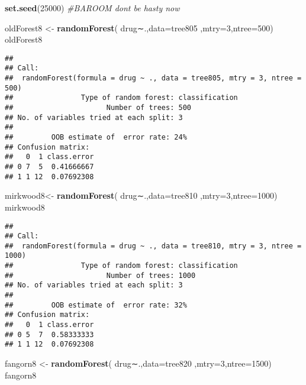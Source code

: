 \documentclass[]{article}
\newenvironment{Shaded}{\begin{snugshade}}{\end{snugshade}}
\newcommand{\KeywordTok}[1]{\textcolor[rgb]{0.13,0.29,0.53}{\textbf{#1}}}
\newcommand{\DataTypeTok}[1]{\textcolor[rgb]{0.13,0.29,0.53}{#1}}
\newcommand{\DecValTok}[1]{\textcolor[rgb]{0.00,0.00,0.81}{#1}}
\newcommand{\StringTok}[1]{\textcolor[rgb]{0.31,0.60,0.02}{#1}}
\newcommand{\CommentTok}[1]{\textcolor[rgb]{0.56,0.35,0.01}{\textit{#1}}}
\newcommand{\NormalTok}[1]{#1}
\begin{document}
\begin{Shaded}
\begin{Highlighting}[]
\KeywordTok{set.seed}\NormalTok{(}\DecValTok{25000}\NormalTok{)}
\CommentTok{#BAROOM dont be hasty now}

\NormalTok{oldForest8 <-}\StringTok{ }\KeywordTok{randomForest}\NormalTok{( drug∼.,}\DataTypeTok{data=}\NormalTok{tree805  ,}\DataTypeTok{mtry=}\DecValTok{3}\NormalTok{,}\DataTypeTok{ntree=}\DecValTok{500}\NormalTok{)}
\NormalTok{oldForest8}
\end{Highlighting}
\end{Shaded}

\begin{verbatim}
## 
## Call:
##  randomForest(formula = drug ~ ., data = tree805, mtry = 3, ntree = 500) 
##                Type of random forest: classification
##                      Number of trees: 500
## No. of variables tried at each split: 3
## 
##         OOB estimate of  error rate: 24%
## Confusion matrix:
##   0  1 class.error
## 0 7  5  0.41666667
## 1 1 12  0.07692308
\end{verbatim}

\begin{Shaded}
\begin{Highlighting}[]
\NormalTok{mirkwood8<-}\StringTok{ }\KeywordTok{randomForest}\NormalTok{( drug∼.,}\DataTypeTok{data=}\NormalTok{tree810  ,}\DataTypeTok{mtry=}\DecValTok{3}\NormalTok{,}\DataTypeTok{ntree=}\DecValTok{1000}\NormalTok{)}
\NormalTok{mirkwood8}
\end{Highlighting}
\end{Shaded}

\begin{verbatim}
## 
## Call:
##  randomForest(formula = drug ~ ., data = tree810, mtry = 3, ntree = 1000) 
##                Type of random forest: classification
##                      Number of trees: 1000
## No. of variables tried at each split: 3
## 
##         OOB estimate of  error rate: 32%
## Confusion matrix:
##   0  1 class.error
## 0 5  7  0.58333333
## 1 1 12  0.07692308
\end{verbatim}

\begin{Shaded}
\begin{Highlighting}[]
\NormalTok{fangorn8 <-}\StringTok{ }\KeywordTok{randomForest}\NormalTok{( drug∼.,}\DataTypeTok{data=}\NormalTok{tree820  ,}\DataTypeTok{mtry=}\DecValTok{3}\NormalTok{,}\DataTypeTok{ntree=}\DecValTok{1500}\NormalTok{)}
\NormalTok{fangorn8}
\end{Highlighting}
\end{Shaded}
\end{document}
